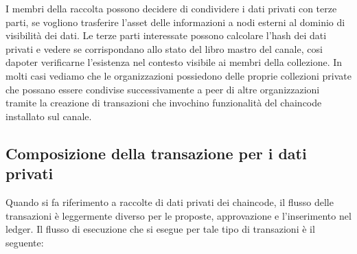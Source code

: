 I membri della raccolta possono decidere di condividere i dati privati con terze parti, se vogliono trasferire l'asset delle informazioni a nodi esterni al dominio di visibilità dei dati. Le terze parti interessate possono calcolare l'hash dei dati privati e vedere se corrispondano allo stato del libro mastro del canale, cosi dapoter verificarne l'esistenza nel contesto visibile ai membri della collezione.
In molti casi vediamo che le organizzazioni possiedono delle proprie collezioni private che possano essere condivise successivamente a peer di altre organizzazioni tramite la creazione di transazioni che invochino funzionalità del chaincode installato sul canale.
\subsection{Composizione della transazione per i dati privati}
Quando si fa riferimento a raccolte di dati privati dei chaincode, il flusso delle transazioni è leggermente diverso per le proposte, approvazione e l'inserimento nel ledger.
Il flusso di esecuzione che si esegue per tale tipo di transazioni è il seguente:
